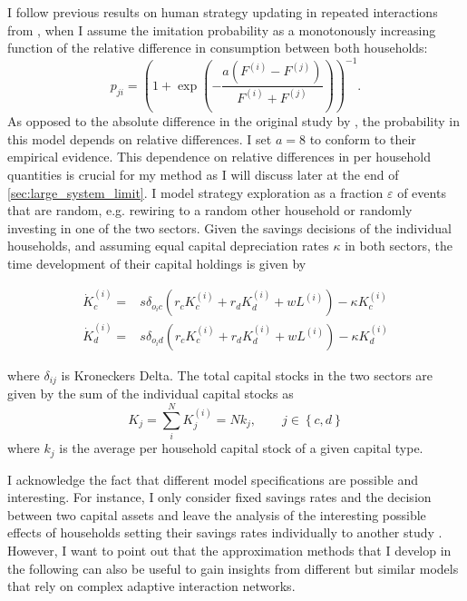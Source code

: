 I follow previous results on human strategy updating in repeated interactions from \cite{Traulsen2010}, when I assume the imitation probability as a monotonously increasing function of the relative difference in consumption between both households:
\begin{equation}
	p_{ji} =  \left(1 + \exp \left(- \frac{a(F^{(i)} - F^{(j)})}{F^{(i)} + F^{(j)}} \right) \right)^{-1}.
    \label{eq:approx_ip}
\end{equation}
As opposed to the absolute difference in the original study by \cite{Traulsen2010}, the probability in this model depends on relative differences. 
I set $a = 8$ to conform to their empirical evidence. This dependence on relative differences in per household quantities is crucial for my method as I will discuss later at the end of \cref{sec:large_system_limit}.
I model strategy exploration as a fraction $\varepsilon$ of events that are random, e.g. rewiring to a random other household or randomly investing in one of the two sectors.
Given the savings decisions of the individual households, and assuming equal capital depreciation rates $\kappa$ in both sectors, the time development of their capital holdings is given by

\begin{align}
  \dot{K}_c^{(i)} =&s \delta_{o_ic} \left( r_c K_c^{(i)} + r_d K_d^{(i)} + w L^{(i)} \right) - \kappa K_c^{(i)} \label{eq:approx_ci}\\
  \dot{K}_d^{(i)} =&s \delta_{o_id} \left( r_c K_c^{(i)} + r_d K_d^{(i)} + w L^{(i)} \right) - \kappa K_d^{(i)} \label{eq:approx_di}
\end{align}

where $\delta_{ij}$ is Kroneckers Delta. The total capital stocks in the two sectors are given by the sum of the individual capital stocks as
\begin{equation}
    K_j = \sum_i^N K_j^{(i)} = N k_j, \qquad j \in \left\{ c, d \right\}
\end{equation}
where $k_j$ is the average per household capital stock of a given capital type.

I acknowledge the fact that different model specifications are possible and interesting.
For instance, I only consider fixed savings rates and the decision between two capital assets and leave the analysis of the interesting possible effects of households setting their savings rates individually to another study \citep{Asano2019}.
However, I want to point out that the approximation methods that I develop in the following can also be useful to gain insights from different but similar models that rely on complex adaptive interaction networks.


